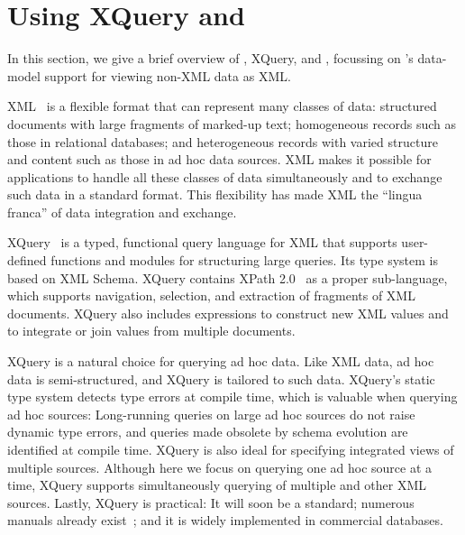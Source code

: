 \section{Using XQuery and \Galax{}}
\label{section:galax}

In this section, we give a brief overview of \Xml{}, XQuery, and
\Galax{}, focussing on \Galax{}'s data-model support for viewing
non-XML data as XML.

XML~\cite{xml10} is a flexible format that can represent many classes
of data: structured documents with large fragments of marked-up text;
homogeneous records such as those in relational databases; and
heterogeneous records with varied structure and content such as those
in ad hoc data sources.  XML makes it possible for applications to
handle all these classes of data simultaneously and to exchange such
data in a standard format.  This flexibility has made XML the ``lingua
franca'' of data integration and exchange.

XQuery~\cite{xquery10} is a typed, functional query language for XML
that supports user-defined functions and modules for structuring large
queries.  Its type system is based on XML Schema.  XQuery contains
XPath 2.0~\cite{xpath} as a proper sub-language, which supports
navigation, selection, and extraction of fragments of XML documents.
XQuery also includes expressions to construct new XML values and to
integrate or join values from multiple documents.  

XQuery is a natural choice for querying ad hoc data.  Like XML data,
ad hoc data is semi-structured, and XQuery is tailored to 
such data.  
XQuery's static type system detects type errors at compile time, which
is valuable when querying ad hoc sources: Long-running queries on
large ad hoc sources do not raise dynamic type errors, and queries
made obsolete by schema evolution are identified at compile time.
XQuery is also ideal for specifying integrated views of multiple
sources.  Although here we focus on querying one ad hoc source at a
time, XQuery supports simultaneously querying of multiple \pads{} and
other XML sources. Lastly, XQuery is practical: It will soon be a
standard; numerous manuals already exist~\cite{brundage2004}; and it is widely implemented
in commercial databases.

